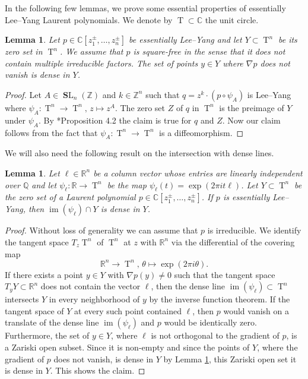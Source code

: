 \documentclass[11pt,letterpaper]{amsart}
\theoremstyle{definition}
\theoremstyle{plain}
\newtheorem{lem}[Def]{Lemma}
\newcommand{\im}{\operatorname{im}}
\newcommand{\T}{\operatorname{T}}
\newcommand{\SL}{\operatorname{{\mathbf SL}}}
\newcommand{\C}{{\mathbb C}}
\newcommand{\R}{{\mathbb R}}
\newcommand{\Q}{{\mathbb Q}}
\newcommand{\Z}{{\mathbb Z}}
\begin{document}
In the following few lemmas, we prove some essential properties of essentially Lee--Yang Laurent polynomials.
We denote by $\T\subset\C$ the unit circle.
\begin{lem}\label{lem:layers}
    Let $p\in\C[z_1^{\pm},\ldots,z_n^{\pm}]$ be essentially Lee--Yang and let $Y\subset\T^n$ be its zero set in $\T^n$. We assume that $p$ is square-free in the sense that it does not contain multiple irreducible factors. The set of points $y\in Y$ where $\nabla p$ does not vanish is dense in $Y$.
\end{lem}
\begin{proof}
    Let $A\in\SL_n(\Z)$ and $k\in\Z^n$ such that $q=z^k\cdot (p\circ\psi_A)$ is Lee--Yang where $\psi_A\colon\T^n\to\T^n,\, z\mapsto z^A$. The zero set $Z$ of $q$ in $\T^n$ is the preimage of $Y$ under $\psi_A$. By \cite{AlonVinzant}*{Proposition 4.2} the claim is true for $q$ and $Z$. Now our claim follows from the fact that $\psi_A\colon\T^n\to\T^n$ is a diffeomorphism.
\end{proof}
We will also need the following result on the intersection with dense lines.
\begin{lem}\label{lem:linedense2}
    Let $\ell\in\R^n$ be a column vector whose entries are linearly independent over $\Q$ and let $\psi_\ell\colon\R\to\T^n$ be the map $\psi_{\ell}(t)=\exp(2\pi i t\ell)$. Let $Y\subset\T^n$ be the zero set of a Laurent polynomial $p\in\C[z_1^{\pm},\ldots,z_n^{\pm}]$. If $p$ is  essentially Lee--Yang, then $\im(\psi_\ell)\cap Y$ is dense in $Y$.
\end{lem}
\begin{proof}
    Without loss of generality we can assume that $p$ is irreducible.
    We identify the tangent space $T_z\T^n$ of $\T^n$ at $z$ with $\R^n$ via the differential of the covering map
    \begin{equation*}
        \R^n\to\T^n,\,\theta\mapsto\exp(2\pi i\theta).
    \end{equation*}
    If there exists a point $y\in Y$ with $\nabla p(y)\neq0$ such that the tangent space ${T}_yY\subset\R^n$ does not contain the vector $\ell$, then the dense line $\im(\psi_\ell)\subset\T^n$ intersects $Y$ in every neighborhood of $y$ by the inverse function theorem. If the tangent space of $Y$ at every such point contained $\ell$, then $p$ would vanish on a translate of the dense line $\im(\psi_\ell)$ and $p$ would be identically zero. Furthermore, the set of $y\in Y$, where $\ell$ is not orthogonal to the gradient of $p$, is a Zariski open subset. Since it is non-empty and since the points of $Y$, where the gradient of $p$ does not vanish, is dense in $Y$ by Lemma \ref{lem:layers}, this Zariski open set it is dense in $Y$. This shows the claim.
\end{proof}
\end{document}
